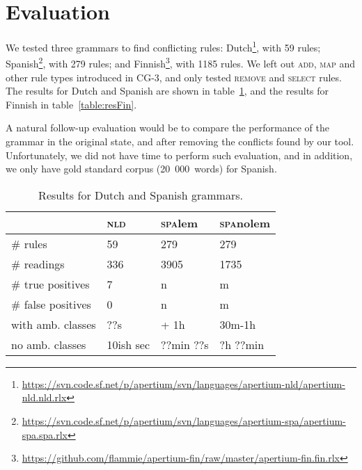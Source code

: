 \section{Evaluation}
\label{sec:eval}

We tested three grammars to find conflicting rules: 
Dutch\footnote{\scriptsize{\url{https://svn.code.sf.net/p/apertium/svn/languages/apertium-nld/apertium-nld.nld.rlx}}},
with 59 rules; 
Spanish\footnote{\scriptsize{\url{https://svn.code.sf.net/p/apertium/svn/languages/apertium-spa/apertium-spa.spa.rlx}}},
with 279 rules; and 
Finnish\footnote{\scriptsize{\url{https://github.com/flammie/apertium-fin/raw/master/apertium-fin.fin.rlx}}},
with 1185 rules. We left out \textsc{add}, \textsc{map} and other rule
types introduced in CG-3, and only tested \textsc{remove} and \textsc{select} rules.
The results for Dutch and Spanish are shown in table~\ref{table:res},
and the results for Finnish in table~\ref{table:resFin}.

A natural follow-up evaluation would be to compare the performance of the
grammar in the original state, and after removing the conflicts found
by our tool. Unfortunately, we did not have time to perform such
evaluation, and in addition, we only have gold standard corpus (20~000~words) for Spanish.



\begin{table}[]
\centering
\begin{tabular}{|l|l|l|l|}

\hline
                   & \textsc{nld}  & \textsc{spa}lem  & \textsc{spa}nolem \\ \hline
\# rules           & 59            & 279       & 279     \\ \hline
\# readings        & 336           & 3905      & 1735    \\ \hline
\# true positives  & 7             & n         & m    \\ \hline
\# false positives & 0             & n         & m    \\ \hline
\clock{} with amb. 
           classes & ??s           & + 1h      & 30m-1h   \\ \hline
\clock{} no amb. 
           classes & 10ish sec       & ??min ??s    & ?h ??min    \\ \hline


\end{tabular}
\caption{Results for Dutch and Spanish grammars.}
\label{table:res}
\end{table}





